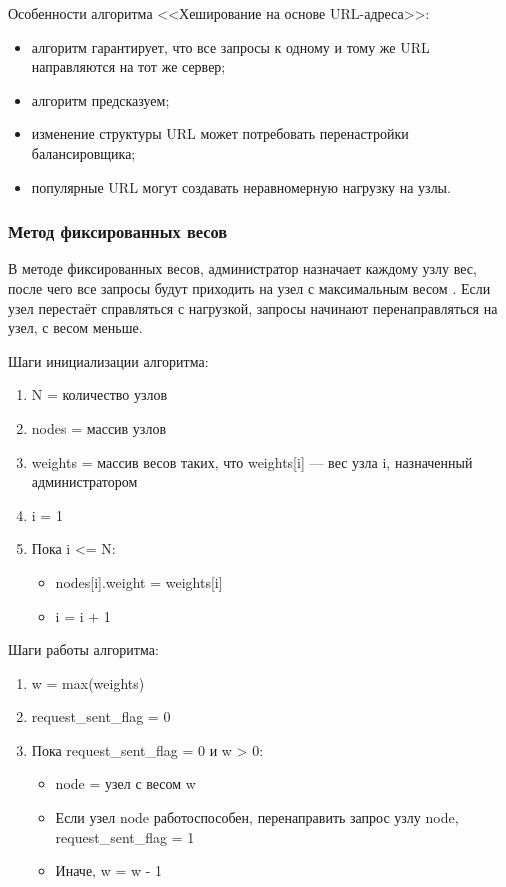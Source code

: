 Особенности алгоритма <<Хеширование на основе URL-адреса>>:
\begin{itemize}
	\item алгоритм гарантирует, что все запросы к одному и тому же URL направляются на тот же сервер;
	\item алгоритм предсказуем;
	\item изменение структуры URL может потребовать перенастройки балансировщика;
	\item популярные URL могут создавать неравномерную нагрузку на узлы.
\end{itemize}

\subsubsection{Метод фиксированных весов}

В методе фиксированных весов, администратор назначает каждому узлу вес, после чего все запросы будут приходить на узел с максимальным весом \cite{kemp}.
Если узел перестаёт справляться с нагрузкой, запросы начинают перенаправляться на узел, с весом меньше.

Шаги инициализации алгоритма:
\begin{enumerate}
	\item N = количество узлов
	\item nodes = массив узлов
	\item weights = массив весов таких, что weights[i] --- вес узла i, назначенный администратором
	\item i = 1
	\item Пока i <= N:
	\begin{itemize}
		\item nodes[i].weight = weights[i]
		\item i = i + 1
	\end{itemize}
\end{enumerate}

Шаги работы алгоритма:
\begin{enumerate}
	\item w = max(weights)
	\item request\_sent\_flag = 0
	\item Пока request\_sent\_flag = 0 и w > 0:
	\begin{itemize}
		\item node = узел с весом w
		\item Если узел node работоспособен, перенаправить запрос узлу node, request\_sent\_flag = 1
		\item Иначе, w = w - 1
	\end{itemize}
\end{enumerate}

